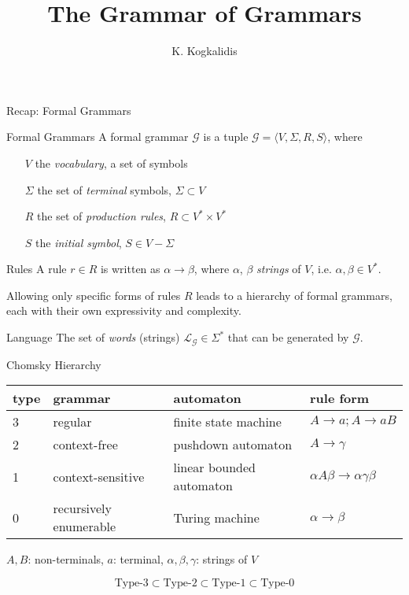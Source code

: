 \documentclass{beamer}
\title{The Grammar of Grammars}
\author{K. Kogkalidis}
\institute{Logic \& Language 2020}
\begin{document}
\date{}
\maketitle

\begin{frame}{Recap: Formal Grammars}
	\small
	\begin{block}{Formal Grammars}
	A formal grammar $\mathcal{G}$ is a tuple $\mathcal{G} = \langle V, \Sigma, R, S \rangle$, where
	\begin{itemize}
		\item[$V$] the \textit{vocabulary}, a set of symbols
		\item [$\Sigma$] the set of \textit{terminal} symbols, $\Sigma \subset V$
		\item [$R$] the set of \textit{production rules}, $R \subset V^*\!\times\! V^*$\\
		\item [$S$] the \textit{initial symbol}, $S \in V - \Sigma$ 
	\end{itemize}
	\end{block}
	\pause
	
	\begin{block}{Rules}
		A rule $r \in R$ is written as $\alpha \to \beta$, where $\alpha$, $\beta$ \textit{strings}	of $V$,
		i.e. $\alpha, \beta \in V^*$.
		
		Allowing only specific forms of rules $R$ leads to a \alert{hierarchy} of formal grammars, each with their own expressivity and complexity.
	\end{block}
	\pause
	
	\begin{block}{Language}
		The set of \textit{words} (strings) $\mathcal{L}_\mathcal{G} \in \Sigma^*$ that can be generated by $\mathcal{G}$.
	\end{block}
\end{frame}

\begin{frame}{Chomsky Hierarchy}
	\footnotesize
    \begin{tabularx}{0.99\textwidth}{@{}llll@{}}
    type & grammar & automaton & rule form\\
    \toprule
    3 & regular & finite state machine & $A\to a; A\to a B$\\
    2 & context-free & pushdown automaton & $A\to \gamma$\\
    1 & context-sensitive & linear bounded automaton & $\alpha A \beta \to \alpha \gamma \beta$ \\
    0 & recursively enumerable & Turing machine & $\alpha \to \beta$
	\end{tabularx}
	
	\begin{flushright}
		$A,B$: non-terminals, $a$: terminal, $\alpha, \beta, \gamma$: strings of $V$
	\end{flushright}
	
	\alert{
	\[
		\text{Type-}3 \subset \text{Type-}2 \subset \text{Type-}1 \subset \text{Type-}0
	\]
	}
\end{frame}
\end{document}
